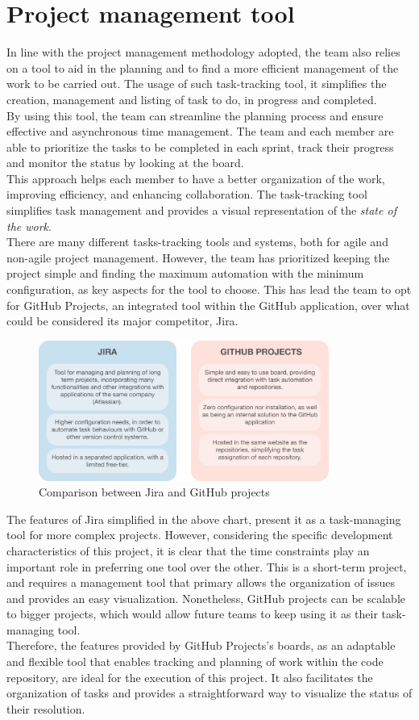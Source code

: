 \documentclass[../memory.tex]{subfiles}
\begin{document}
\section{Project management tool}
In line with the project management methodology adopted, the team also relies on
a tool to aid in the planning and to find a more efficient management of the
work to be carried out. The usage of such task-tracking tool, it simplifies the
creation, management and listing of task to do, in progress and completed.
\\
By using this tool, the team can streamline the planning process and ensure
effective and asynchronous time management. The team and each member are able to
prioritize the tasks to be completed in each sprint, track their progress and
monitor the status by looking at the board.
\\
This approach helps each member to have a better organization of the work,
improving efficiency, and enhancing collaboration. The task-tracking tool
simplifies task management and provides a visual representation of the
\emph{state of the work}.
\\[8pt]
There are many different tasks-tracking tools and systems, both for agile and
non-agile project management. However, the team has prioritized keeping the
project simple and finding the maximum automation with the minimum
configuration, as key aspects for the tool to choose. This has lead the team to
opt for GitHub Projects, an integrated tool within the GitHub application, over
what could be considered its major competitor, Jira.
\begin{figure}[H]
	\centering
	\includegraphics[width=0.85\textwidth]{./assets/jira-vs-github.png}
	\caption{Comparison between Jira and GitHub projects}
\end{figure}
The features of Jira simplified in the above chart, present it as a
task-managing tool for more complex projects. However, considering the specific
development characteristics of this project, it is clear that the time
constraints play an important role in preferring one tool over the other. This
is a short-term project, and requires a management tool that primary allows the
organization of issues and provides an easy visualization. Nonetheless, GitHub
projects can be scalable to bigger projects, which would allow future teams to
keep using it as their task-managing tool.
\\
Therefore, the features provided by GitHub Projects's boards, as an adaptable
and flexible tool that enables tracking and planning of work within the code
repository, are ideal for the execution of this project. It also facilitates the
organization of tasks and provides a straightforward way to visualize the status
of their resolution.
\end{document}
